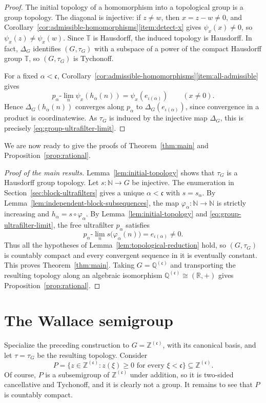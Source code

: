 \documentclass[11pt]{amsart}
\theoremstyle{definition}
\newcommand{\T}{\mathbb T}
\newcommand{\N}{\mathbb N}
\newcommand{\Z}{\mathbb Z}
\newcommand{\Q}{\mathbb Q}
\newcommand{\cfrak}{\mathfrak c}
\begin{document}
\begin{proof}
The initial topology of a homomorphism into a topological group is a group
topology.  The diagonal is injective: if $z\neq w$, then $x=z-w\neq0$, and
Corollary~\ref{cor:admissible-homomorphisms}\ref{item:detect-x} gives
$\psi_x(x)\neq0$, so
$\psi_x(z)\neq\psi_x(w)$.  Since $\T$ is Hausdorff, the induced
topology is Hausdorff.  In fact, $\Delta_G$ identifies $(G,\tau_G)$ with a
subspace of a power of the compact Hausdorff group $\T$, so
$(G,\tau_G)$ is Tychonoff.

For a fixed $\alpha<\cfrak$,
Corollary~\ref{cor:admissible-homomorphisms}\ref{item:all-admissible} gives
\[
 p_\alpha\text{-}\lim_n\psi_x(h_\alpha(n))
 =\psi_x(e_{\iota(\alpha)})\qquad(x\neq0).
\]
Hence $\Delta_G(h_\alpha(n))$ converges along $p_\alpha$ to
$\Delta_G(e_{\iota(\alpha)})$, since convergence in a product is
coordinatewise.  As $\tau_G$ is induced by the injective map
$\Delta_G$, this is precisely \eqref{eq:group-ultrafilter-limit}.
\end{proof}

We are now ready to give the proofs of Theorem~\ref{thm:main} and
Proposition~\ref{prop:rational}.

\begin{proof}[Proof of the main results]
Lemma~\ref{lem:initial-topology} shows that $\tau_G$ is a Hausdorff group
topology.  Let $s:\N\to G$ be injective.  The enumeration in
Section~\ref{sec:block-ultrafilters} gives a unique $\alpha<\cfrak$ with
$s=s_\alpha$.  By
Lemma~\ref{lem:independent-block-subsequences}, the map
$\varphi_\alpha:\N\to\N$ is strictly increasing and
$h_\alpha=s\circ\varphi_\alpha$.  By
Lemma~\ref{lem:initial-topology} and
\eqref{eq:group-ultrafilter-limit}, the free ultrafilter $p_\alpha$
satisfies
\[
 p_\alpha\text{-}\lim_n s\bigl(\varphi_\alpha(n)\bigr)
 =e_{\iota(\alpha)}\neq0.
\]
Thus all the hypotheses of Lemma~\ref{lem:topological-reduction} hold,
so $(G,\tau_G)$ is countably compact and every convergent sequence in it is
eventually constant.  This proves Theorem~\ref{thm:main}.  Taking
$G=\Q^{(\cfrak)}$ and transporting the resulting topology along an algebraic
isomorphism $\Q^{(\cfrak)}\cong(\mathbb R,+)$ gives
Proposition~\ref{prop:rational}.
\end{proof}

\section{The Wallace semigroup}

Specialize the preceding construction to $G=\Z^{(\cfrak)}$, with its
canonical basis, and let $\tau=\tau_G$ be the resulting topology.  Consider
\[
 P=\{z\in\Z^{(\cfrak)}:z(\xi)\geq0\text{ for every }\xi<\cfrak\}\subseteq \Z^{(\cfrak)}.
\]
Of course, $P$ is a subsemigroup of $\mathbb Z^{(\cfrak)}$ under addition, so
it is two-sided cancellative and Tychonoff, and it is clearly not a group.
It remains to see that $P$ is countably compact.
\end{document}
